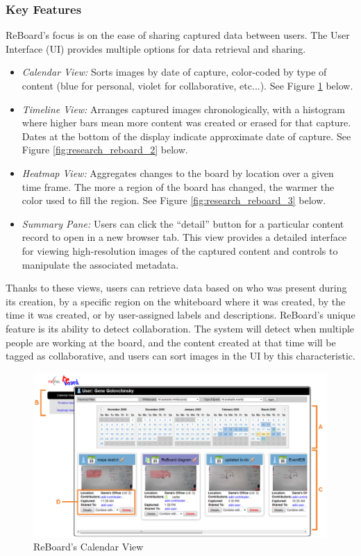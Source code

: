 \documentclass{article}
\begin{document}
	\subsubsection*{Key Features}
ReBoard's focus is on the ease of sharing captured data between users.  The User Interface (UI) provides multiple options for data retrieval and sharing.  
\begin{itemize} \itemsep -2pt
	\item \emph{Calendar View:} Sorts images by date of capture, color-coded by type of content (blue for personal, violet for collaborative, etc...). See Figure \ref{fig:research_reboard_1} below.  
	\item \emph{Timeline View:} Arranges captured images chronologically, with a histogram where higher bars mean more content was created or erased for that capture.  Dates at the bottom of the display indicate approximate date of capture. See Figure \ref{fig:research_reboard_2} below.
	\item \emph{Heatmap View:} Aggregates changes to the board by location over a given time frame.  The more a region of the board has changed, the warmer the color used to fill the region. See Figure \ref{fig:research_reboard_3} below.
	\item \emph{Summary Pane:} Users can click the ``detail'' button for a particular content record to open in a new browser tab.  This view provides a detailed interface for viewing high-resolution images of the captured content and controls to manipulate the associated metadata. 
\end{itemize}
Thanks to these views, users can retrieve data based on who was present during its creation, by a specific region on the whiteboard where it was created, by the time it was created, or by user-assigned labels and descriptions.  \newline
\indent ReBoard's unique feature is its ability to detect collaboration.  The system will detect when multiple people are working at the board, and the content created at that time will be tagged as collaborative, and users can sort images in the UI by this characteristic.  

\begin{figure}[H]
\centering
\includegraphics[scale=0.4]{images/research_reboard_1}
\caption{ReBoard's Calendar View}
\label{fig:research_reboard_1}
\end{figure}
\end{document}
